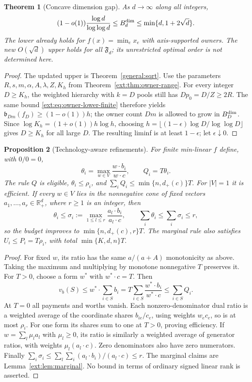 \documentclass[11pt]{article}
\newtheorem{theorem}{Theorem}[section]
\newtheorem{proposition}[theorem]{Proposition}
\theoremstyle{definition}\newtheorem{definition}[theorem]{Definition}
\theoremstyle{remark}\newtheorem{remark}[theorem]{Remark}
\newcommand{\R}{\mathbb R}
\begin{document}
\begin{theorem}[Concave dimension gap]\label{ext:thm:dim-gap}
As $d\to\infty$ along all integers,
\[
 (1-o(1))\frac{\log d}{\log\log d}\le B_d^{\rm dim}
 \le\min\{d,1+2\sqrt d\}.
\]
The lower already holds for $f(x)=\min_ex_e$ with axis-supported owners.
The new $O(\sqrt d)$ upper holds for all $\mathfrak F_d$; its unrestricted
optimal order is not determined here.
\end{theorem}
\begin{proof}
The updated upper is Theorem~\ref{general:sqrt}.
Use the parameters $R,s,m,\alpha,A,\lambda,Z,K_h$ from
Theorem~\ref{ext:thm:owner-range}.  For every integer $D\ge K_h$, the weighted
hierarchy with $k=D$ pools still has $Dp_0=D/Z\ge2R$.
The same bound \eqref{ext:eq:owner-lower-finite} therefore yields
$\mathfrak b_{Dm}(f_D)\ge(1-o(1))h$; the owner count $Dm$ is allowed to grow
in $B_D^{\rm dim}$.  Since $\log K_h=(1+o(1))h\log h$, choosing
$h=\lfloor(1-\epsilon)\log D/\log\log D\rfloor$ gives $D\ge K_h$ for all
large $D$.  The resulting liminf is at least $1-\epsilon$;
let $\epsilon\downarrow0$.
\end{proof}

\begin{proposition}[Technology-aware refinements]\label{ext:prop:dual-share}
For finite min-linear $f$ define, with $0/0=0$,
\[
 \theta_i=\max_{w\in V}\frac{w\cdot b_i}{w\cdot c},\qquad Q_i=T\theta_i.
\]
The rule $Q$ is eligible, $\theta_i\le\rho_i$, and
$\sum_iQ_i\le\min\{n,d_+(c)\}T$.  For $|V|=1$ it is efficient.
If every $w\in V$ lies in the nonnegative cone of fixed vectors
$a_1,\ldots,a_r\in\R_+^d$, where $r\ge1$ is an integer, then
\[
 \theta_i\le\sigma_i:=\max_{1\le l\le r}\frac{a_l\cdot b_i}{a_l\cdot c},
 \qquad\sum_i\theta_i\le\sum_i\sigma_i\le r,
\]
so the budget improves to $\min\{n,d_+(c),r\}T$.
The marginal rule also satisfies $U_i\le P_i=T\rho_i$, with total
$\min\{K,d,n\}T$.
\end{proposition}
\begin{proof}
For fixed $w$, its ratio has the same $a/(a+A)$ monotonicity as above.
Taking the maximum and multiplying by monotone nonnegative $T$ preserves it.
For $T>0$, choose a form $w^*$ with $w^*\cdot c=T$.  Then
\[
 v_b(S)\le w^*\cdot\sum_{i\in S}b_i
     =T\sum_{i\in S}\frac{w^*\cdot b_i}{w^*\cdot c}
     \le\sum_{i\in S}Q_i.
\]
At $T=0$ all payments and worths vanish.
Each nonzero-denominator dual ratio is a weighted average of the coordinate
shares $b_{ie}/c_e$, using weights $w_ec_e$, so is at most $\rho_i$.
For one form its shares sum to one at $T>0$, proving efficiency.
If $w=\sum_l\mu_la_l$ with $\mu_l\ge0$, its ratio is similarly a weighted
average of generator ratios, with weights $\mu_l(a_l\cdot c)$.
Zero denominators also have zero numerators.  Finally
$\sum_i\sigma_i\le\sum_l\sum_i(a_l\cdot b_i)/(a_l\cdot c)\le r$.
The marginal claims are Lemma~\ref{ext:lem:marginal}.
No bound in terms of ordinary signed linear rank is asserted.
\end{proof}
\end{document}
